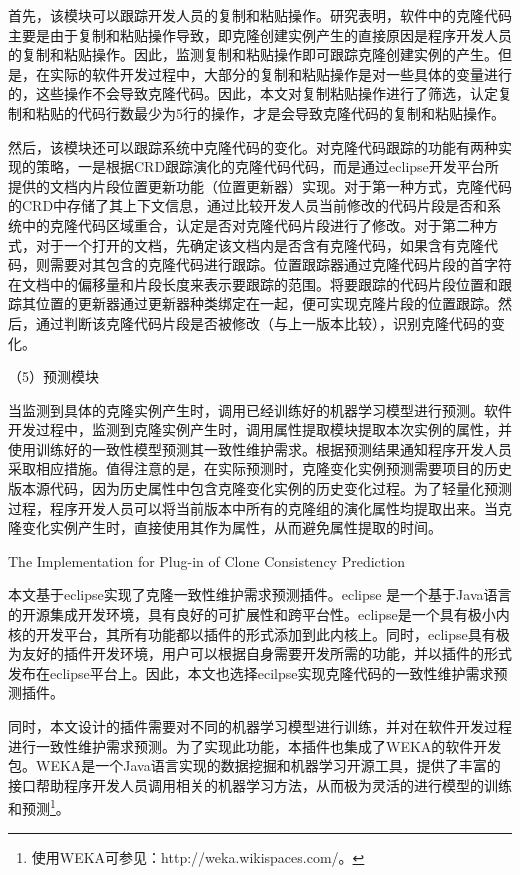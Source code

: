 首先，该模块可以跟踪开发人员的复制和粘贴操作。研究表明，软件中的克隆代码主要是由于复制和粘贴操作导致，即克隆创建实例产生的直接原因是程序开发人员的复制和粘贴操作。因此，监测复制和粘贴操作即可跟踪克隆创建实例的产生。但是，在实际的软件开发过程中，大部分的复制和粘贴操作是对一些具体的变量进行的，这些操作不会导致克隆代码。因此，本文对复制粘贴操作进行了筛选，认定复制和粘贴的代码行数最少为5行的操作，才是会导致克隆代码的复制和粘贴操作。

然后，该模块还可以跟踪系统中克隆代码的变化。对克隆代码跟踪的功能有两种实现的策略，一是根据CRD跟踪演化的克隆代码代码，而是通过eclipse开发平台所提供的文档内片段位置更新功能（位置更新器）实现。对于第一种方式，克隆代码的CRD中存储了其上下文信息，通过比较开发人员当前修改的代码片段是否和系统中的克隆代码区域重合，认定是否对克隆代码片段进行了修改。对于第二种方式，对于一个打开的文档，先确定该文档内是否含有克隆代码，如果含有克隆代码，则需要对其包含的克隆代码进行跟踪。位置跟踪器通过克隆代码片段的首字符在文档中的偏移量和片段长度来表示要跟踪的范围。将要跟踪的代码片段位置和跟踪其位置的更新器通过更新器种类绑定在一起，便可实现克隆片段的位置跟踪。然后，通过判断该克隆代码片段是否被修改（与上一版本比较），识别克隆代码的变化。

（5）预测模块

当监测到具体的克隆实例产生时，调用已经训练好的机器学习模型进行预测。软件开发过程中，监测到克隆实例产生时，调用属性提取模块提取本次实例的属性，并使用训练好的一致性模型预测其一致性维护需求。根据预测结果通知程序开发人员采取相应措施。值得注意的是，在实际预测时，克隆变化实例预测需要项目的历史版本源代码，因为历史属性中包含克隆变化实例的历史变化过程。为了轻量化预测过程，程序开发人员可以将当前版本中所有的克隆组的演化属性均提取出来。当克隆变化实例产生时，直接使用其作为属性，从而避免属性提取的时间。

{The Implementation for Plug-in of Clone Consistency Prediction}

本文基于eclipse实现了克隆一致性维护需求预测插件。eclipse 是一个基于Java语言的开源集成开发环境，具有良好的可扩展性和跨平台性。eclipse是一个具有极小内核的开发平台，其所有功能都以插件的形式添加到此内核上。同时，eclipse具有极为友好的插件开发环境，用户可以根据自身需要开发所需的功能，并以插件的形式发布在eclipse平台上。因此，本文也选择ecilpse实现克隆代码的一致性维护需求预测插件。

同时，本文设计的插件需要对不同的机器学习模型进行训练，并对在软件开发过程进行一致性维护需求预测。为了实现此功能，本插件也集成了WEKA的软件开发包。WEKA是一个Java语言实现的数据挖掘和机器学习开源工具，提供了丰富的接口帮助程序开发人员调用相关的机器学习方法，从而极为灵活的进行模型的训练和预测\footnote{使用WEKA可参见：http://weka.wikispaces.com/。}。

